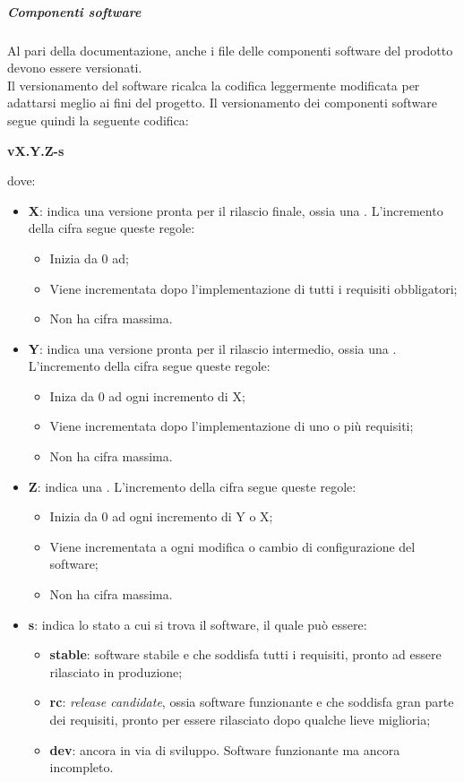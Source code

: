 \documentclass[../norme-di-progetto.tex]{subfiles}
\begin{document}
\subparagraph{Componenti software}
Al pari della documentazione, anche i file delle componenti software del prodotto devono essere versionati. \\
Il versionamento del software ricalca la codifica  leggermente modificata per adattarsi meglio ai fini del progetto. Il versionamento dei componenti software segue quindi la seguente codifica:  \\
\begin{center}
  \centering
  \textbf{vX.Y.Z-{s}}
\end{center} dove:
\begin{itemize}
  \item \textbf{X}: indica una versione pronta per il rilascio finale, ossia una . L'incremento della cifra segue queste regole:
  \begin{itemize}
    \item Inizia da 0 ad;
    \item Viene incrementata dopo l'implementazione di tutti i requisiti obbligatori;
    \item Non ha cifra massima.
  \end{itemize}
  \item \textbf{Y}: indica una versione pronta per il rilascio intermedio, ossia una . L'incremento della cifra segue queste regole:
  \begin{itemize}
    \item Iniza da 0 ad ogni incremento di X;
    \item Viene incrementata dopo l'implementazione di uno o più requisiti;
    \item Non ha cifra massima.
  \end{itemize}
  \item \textbf{Z}: indica una . L'incremento della cifra segue queste regole:
  \begin{itemize}
    \item Inizia da 0 ad ogni incremento di Y o X;
    \item Viene incrementata a ogni modifica o cambio di configurazione del software;
    \item Non ha cifra massima.
  \end{itemize}
  \item \textbf{s}: indica lo stato a cui si trova il software, il quale può essere:
  \begin{itemize}
    \item \textbf{stable}: software stabile e che soddisfa tutti i requisiti, pronto ad essere rilasciato in produzione;
    \item \textbf{rc}: \textit{release candidate}, ossia software funzionante e che soddisfa gran parte dei requisiti, pronto per essere rilasciato dopo qualche lieve miglioria;
    \item \textbf{dev}: ancora in via di sviluppo. Software funzionante ma ancora incompleto.
  \end{itemize}
\end{itemize}
\end{document}
